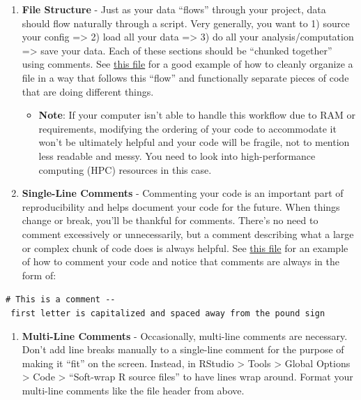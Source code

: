 \documentclass[
]{book}
\providecommand{\tightlist}{%
  \setlength{\itemsep}{0pt}\setlength{\parskip}{0pt}}
\begin{document}
\begin{enumerate}
\def\labelenumi{\arabic{enumi}.}
\setcounter{enumi}{1}
\tightlist
\item
  \textbf{File Structure} - Just as your data ``flows'' through your project, data should flow naturally through a script. Very generally, you want to 1) source your config =\textgreater{} 2) load all your data =\textgreater{} 3) do all your analysis/computation =\textgreater{} save your data. Each of these sections should be ``chunked together'' using comments. See \href{https://github.com/kmishra9/Flu-Absenteeism/blob/master/Master's\%20Thesis\%20-\%20Spatial\%20Epidemiology\%20of\%20Influenza/2a\%20-\%20Statistical-Inputs.R}{this file} for a good example of how to cleanly organize a file in a way that follows this ``flow'' and functionally separate pieces of code that are doing different things.

  \begin{itemize}
  \tightlist
  \item
    \textbf{Note}: If your computer isn't able to handle this workflow due to RAM or requirements, modifying the ordering of your code to accommodate it won't be ultimately helpful and your code will be fragile, not to mention less readable and messy. You need to look into high-performance computing (HPC) resources in this case.
  \end{itemize}
\item
  \textbf{Single-Line Comments} - Commenting your code is an important part of reproducibility and helps document your code for the future. When things change or break, you'll be thankful for comments. There's no need to comment excessively or unnecessarily, but a comment describing what a large or complex chunk of code does is always helpful. See \href{https://github.com/kmishra9/Flu-Absenteeism/blob/master/Master's\%20Thesis\%20-\%20Spatial\%20Epidemiology\%20of\%20Influenza/1b\%20-\%20Map-Management.R}{this file} for an example of how to comment your code and notice that comments are always in the form of:
\end{enumerate}

\texttt{\#\ This\ is\ a\ comment\ -\/-\ first\ letter\ is\ capitalized\ and\ spaced\ away\ from\ the\ pound\ sign}

\begin{enumerate}
\def\labelenumi{\arabic{enumi}.}
\setcounter{enumi}{3}
\tightlist
\item
  \textbf{Multi-Line Comments} - Occasionally, multi-line comments are necessary. Don't add line breaks manually to a single-line comment for the purpose of making it ``fit'' on the screen. Instead, in RStudio \textgreater{} Tools \textgreater{} Global Options \textgreater{} Code \textgreater{} ``Soft-wrap R source files'' to have lines wrap around. Format your multi-line comments like the file header from above.
\end{enumerate}
\end{document}
